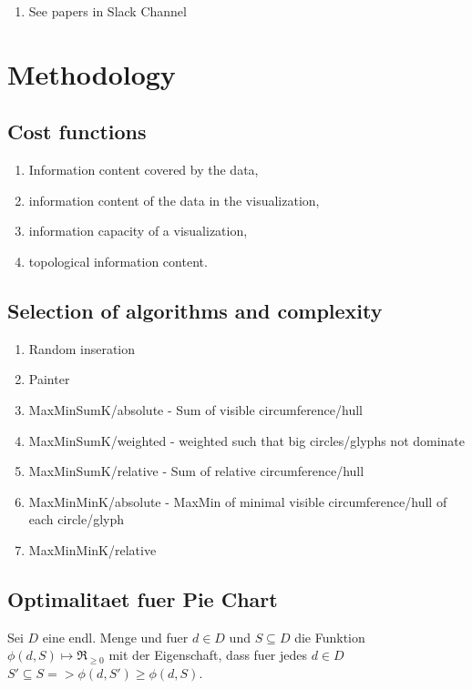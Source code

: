\documentclass[a4paper,11pt]{article}
\theoremstyle{mytheor}
\begin{document}
\begin{enumerate}
  \item See papers in Slack Channel
\end{enumerate}

\newpage
\section{Methodology}

\subsection{Cost functions}

\begin{enumerate}
  \item Information content covered by the data,
  \item information content of the data in the visualization,
  \item information capacity of a visualization,
  \item topological information content.
\end{enumerate}



\subsection{Selection of algorithms and complexity}

\begin{enumerate}
  \item Random inseration
  \item Painter
  \item MaxMinSumK/absolute - Sum of visible circumference/hull
  \item MaxMinSumK/weighted - weighted such that big circles/glyphs not dominate
  \item MaxMinSumK/relative - Sum of relative circumference/hull
  \item MaxMinMinK/absolute - MaxMin of minimal visible circumference/hull of each circle/glyph
  \item MaxMinMinK/relative
\end{enumerate}

\subsection{Optimalitaet fuer Pie Chart}

Sei $ D $ eine endl. Menge und fuer $ d \in D $ und $ S \subseteq D$ die Funktion $ \phi(d, S) \mapsto \Re_{\geq 0}$ mit der Eigenschaft, dass fuer jedes $d \in D$ $S' \subseteq S => \phi(d, S') \geq \phi(d, S)$.
\end{document}
